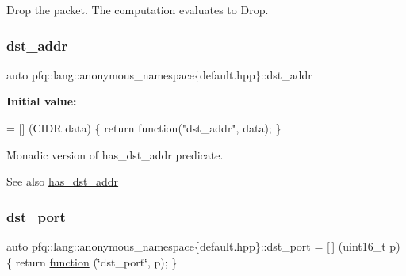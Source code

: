 Drop the packet. The computation evaluates to {\ttfamily Drop}. 

\mbox{\label{namespacepfq_1_1lang_1_1anonymous__namespace_02default_8hpp_03_a3f51de44baa33ff19a94995945636072}} 
\subsubsection{\texorpdfstring{dst\+\_\+addr}{dst\_addr}}
{\footnotesize\ttfamily auto pfq\+::lang\+::anonymous\+\_\+namespace\{default.\+hpp\}\+::dst\+\_\+addr}

{\bfseries Initial value\+:}
\begin{DoxyCode}
= [] (CIDR data)
        \{
            \textcolor{keywordflow}{return} \textcolor{keyword}{function}(\textcolor{stringliteral}{"dst\_addr"}, data);
        \}
\end{DoxyCode}


Monadic version of {\ttfamily has\+\_\+dst\+\_\+addr} predicate. 

\begin{DoxySeeAlso}{See also}
\hyperlink{namespacepfq_1_1lang_1_1anonymous__namespace_02default_8hpp_03_a0a53822af0ed8ea341f16a1da5ea83e3}{has\+\_\+dst\+\_\+addr} 
\end{DoxySeeAlso}
\mbox{\label{namespacepfq_1_1lang_1_1anonymous__namespace_02default_8hpp_03_a25a3b35caf255c109a6c5b4f601b1b61}} 
\subsubsection{\texorpdfstring{dst\+\_\+port}{dst\_port}}
{\footnotesize\ttfamily auto pfq\+::lang\+::anonymous\+\_\+namespace\{default.\+hpp\}\+::dst\+\_\+port = \mbox{[}$\,$\mbox{]} (uint16\+\_\+t p) \{ return \hyperlink{namespacepfq_1_1lang_a1a4638059d700ae08d0ca63886ff2bb3}{function} (\char`\"{}dst\+\_\+port\char`\"{}, p); \}}



